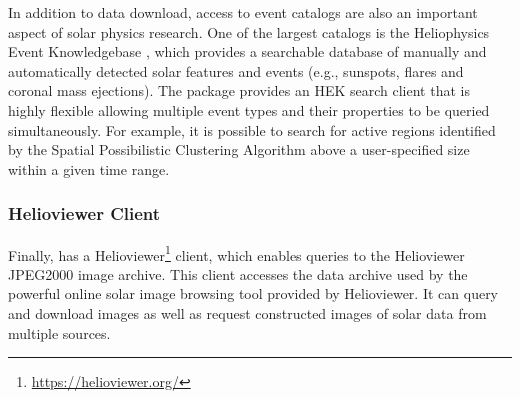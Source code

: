 In addition to data download, access to event catalogs are also an important aspect of solar physics research.
One of the largest catalogs is the Heliophysics Event Knowledgebase \citep[HEK,][]{hek}, which provides a searchable database of manually and automatically detected solar features and events (e.g., sunspots, flares and coronal mass ejections). The \sunpypkg package provides an HEK search client that is highly flexible allowing multiple event types and their properties to be queried simultaneously.
For example, it is possible to search for active regions identified by the Spatial Possibilistic Clustering Algorithm \citep[SPoCA,][]{2014AA...561A..29V} above a user-specified size within a given time range.

\subsubsection{Helioviewer Client}
\label{sec:helioviewer}

Finally,  has a Helioviewer\footnote{\url{https://helioviewer.org/}} client, which enables queries to the Helioviewer JPEG2000 image archive.
This client accesses the data archive used by the powerful online solar image browsing tool provided by Helioviewer.
It can query and download images as well as request constructed images of solar data from multiple sources.
